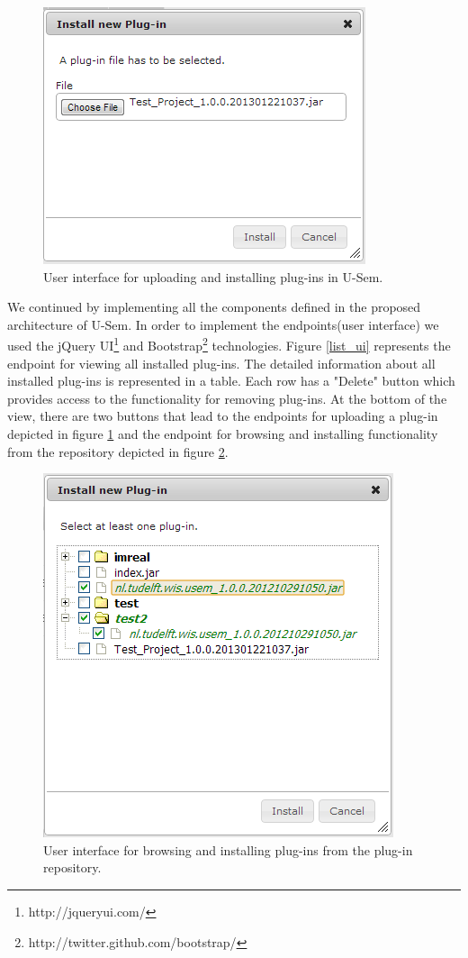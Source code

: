 \begin{figure}[h!]
  \centering
  	\includegraphics[scale=0.6]{plug-in/ui/upload.png}
  \caption{User interface for uploading and installing plug-ins in U-Sem.}
  \label{upload_ui}
\end{figure}

We continued by implementing all the components defined in the proposed architecture of U-Sem. In order to implement the endpoints(user interface) we used the jQuery UI\footnote{http://jqueryui.com/} and Bootstrap\footnote{http://twitter.github.com/bootstrap/} technologies. Figure \ref{list_ui} represents the endpoint for viewing all installed plug-ins. The detailed information about all installed plug-ins is represented in a table. Each row has a "Delete" button which provides access to the functionality for removing plug-ins. At the bottom of the view, there are two buttons that lead to the endpoints for uploading a plug-in depicted in figure \ref{upload_ui} and the endpoint for browsing and installing functionality from the repository depicted in figure \ref{repo_ui}.

\begin{figure}[h!]
  \centering
  	\includegraphics[scale=0.6]{plug-in/ui/repo.png}
  \caption{User interface for browsing and installing plug-ins from the plug-in repository.}
  \label{repo_ui}
\end{figure}

